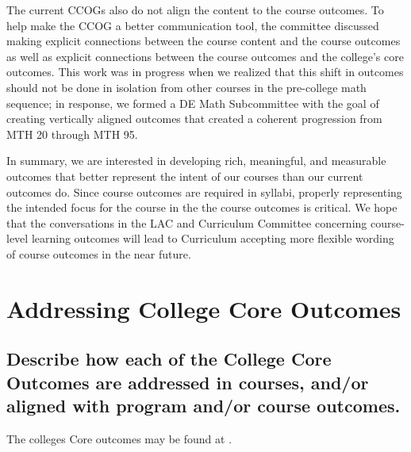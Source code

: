 The current CCOGs also do not align the content to the course outcomes. To help
make the CCOG a better communication tool, the committee discussed making
explicit connections between the course content and the course outcomes as well
as explicit connections between the course outcomes and the college's core
outcomes.  This work was in progress when we realized that this shift in
outcomes should not be done in isolation from other courses in the pre-college
math sequence; in response, we formed a DE Math Subcommittee with the goal of
creating vertically aligned outcomes that created a coherent progression from
MTH 20 through MTH 95.

In summary, we are interested in developing rich, meaningful, and measurable
outcomes that better represent the intent of our courses than our current
outcomes do. Since course outcomes are required in syllabi, properly
representing the intended focus for the course in the the course outcomes is
critical. We hope that the conversations in the LAC and Curriculum Committee
concerning course-level learning outcomes will lead to Curriculum accepting more
flexible wording of course outcomes in the near future.

\section{Addressing College Core Outcomes}

\subsection{Describe how each of the College Core Outcomes are addressed in
courses, and/or aligned with program and/or course outcomes.}

The colleges Core outcomes may be found at \cite{coreoutcomes}.

